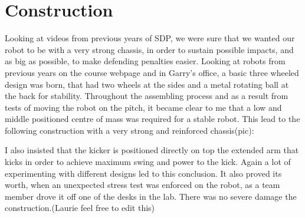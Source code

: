 \section{Construction}

Looking at videos from previous years of SDP, we were sure that we wanted our robot to be with a very strong chassis, in order to sustain possible impacts, and as big as possible, to make defending penalties easier. Looking at robots from previous years on the course webpage and in Garry’s office, a basic three wheeled design was born, that had two wheels at the sides and a metal rotating ball at the back for stability. Throughout the assembling process and as a result from tests of moving the robot on the pitch, it became clear to me that a low and middle positioned centre of mass was required for a stable robot. This lead to the following construction with a very strong and reinforced chassis(pic): 

I also insisted that the kicker is positioned directly on top the extended arm that kicks in order to achieve maximum swing and power to the kick. Again a lot of experimenting with different designs led to this conclusion. It also proved its worth, when an unexpected stress test was enforced on the robot, as a team member drove it off one of the desks in the lab. There was no severe damage the construction.(Laurie feel free to edit this) 

